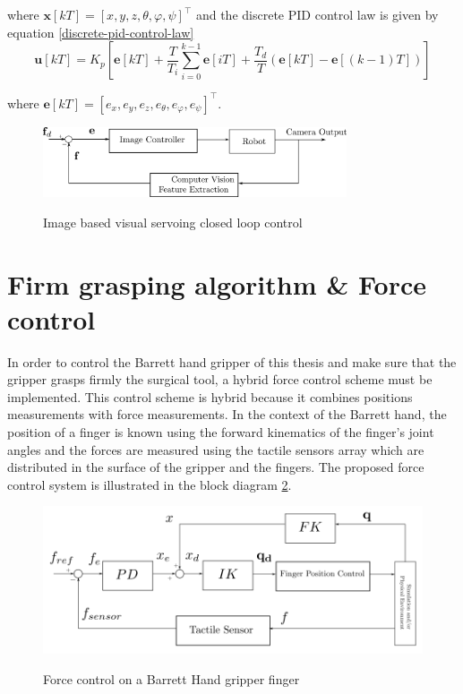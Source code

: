 where $\mathbf{x}[kT] = [x, y, z, θ, φ, ψ]^\top$ and the discrete PID control law is given by equation \ref{discrete-pid-control-law}
\begin{equation}
\label{discrete-pid-control-law}
\mathbf{u}[kT] = K_p \left[ \mathbf{e}[kT] + \frac{T}{T_i} \sum_{i=0}^{k-1} \mathbf{e}[iT] + \frac{T_d}{T} \left( \mathbf{e}[kT] - \mathbf{e}[(k-1)T] \right) \right]
\end{equation}

where $\mathbf{e}[kT] = [e_x, e_y, e_z, e_θ, e_φ, e_ψ]^\top$.

\begin{center}
\begin{figure}[!htb]
\centering
\includegraphics[width=0.8\textwidth]{images/visual-servoing-image-based.png}\\
\caption{Image based visual servoing closed loop control}
\label{visual-servoing-image-based-control}
\end{figure}
\end{center}


\section{Firm grasping algorithm \& Force control}

In order to control the Barrett hand gripper of this thesis and make sure that the gripper grasps firmly the surgical tool, a hybrid force control scheme must be implemented. This control scheme is hybrid because it 
combines positions measurements with force measurements. In the context of the Barrett hand, the position of a finger is known using the forward kinematics of the finger's joint angles and the forces are measured using 
the tactile sensors array which are distributed in the surface of the gripper and the fingers. The proposed force control system is illustrated in the block diagram \ref{finger-force-control}.

\begin{center}
\begin{figure}[!htb]
\centering
\includegraphics[width=12cm]{images/finger-force-control.png}\\
\caption{Force control on a Barrett Hand gripper finger}
\label{finger-force-control}
\end{figure}
\end{center}

